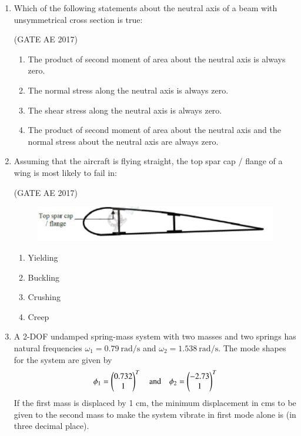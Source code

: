 \documentclass[journal,12pt,onecolumn]{IEEEtran}
\theoremstyle{remark}
\begin{document}
\begin{flushleft}
\begin{enumerate}
\item Which of the following statements about the neutral axis of a beam with unsymmetrical cross section is true:  

\hfill (GATE AE 2017)

\begin{enumerate}
\item The product of second moment of area about the neutral axis is always zero.
\item The normal stress along the neutral axis is always zero.
\item The shear stress along the neutral axis is always zero.
\item The product of second moment of area about the neutral axis and the normal stress about the neutral axis are always zero.
\end{enumerate}

\item Assuming that the aircraft is flying straight, the top spar cap / flange of a wing is most likely to fail in:  

\hfill (GATE AE 2017)
\begin{figure}[H]
    \centering
    \includegraphics[width=0.5\columnwidth]{figs/21.png}
    \caption{}
    \label{fig:placeholder}
\end{figure}
\begin{multicols}{2}
\begin{enumerate}
\item Yielding
\item Buckling
\item Crushing
\item Creep
\end{enumerate}
\end{multicols}

\item A 2-DOF undamped spring-mass system with two masses and two springs has natural frequencies $\omega_1 = 0.79 \ \text{rad/s}$ and $\omega_2 = 1.538 \ \text{rad/s}$. The mode shapes for the system are given by  
\[
\phi_1 = \begin{pmatrix}0.732 \\ 1\end{pmatrix}^T \quad \text{and} \quad \phi_2 = \begin{pmatrix}-2.73 \\ 1\end{pmatrix}^T
\]  
If the first mass is displaced by 1 cm, the minimum displacement in cms to be given to the second mass to make the system vibrate in first mode alone is \underline{\hspace{2cm}} (in three decimal place).  


\end{enumerate}
\end{flushleft}
\end{document}
